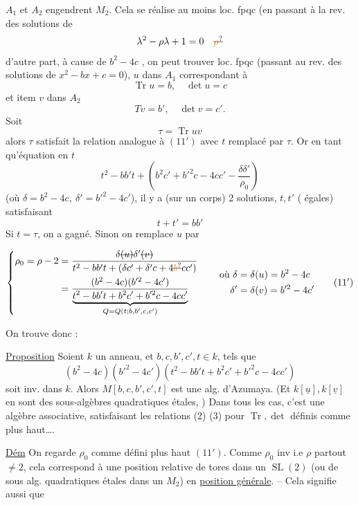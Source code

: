 $A_1$ et $A_2$  engendrent $M_2$. Cela se réalise au moins loc. fpqc (en passant à la  rev. des solutions de
\[ \lambda^2-\rho\lambda+1=0\quad\deleted{\unsure{\rho}} \]
d'autre part, à cause de $b^2-4c$ , on peut trouver loc. fpqc (passant au rev. des solutions de $x^2-bx+c=0$), $u$ dans $A_1$ correspondant à
\[ \operatorname{Tr}u=b,\quad \det u=c \]
et item $v$ dans $A_2$
\[ Tv=b',\quad \det v=c'. \]
Soit 
\[ \tau=\operatorname{Tr}uv \]
alors $\tau$ satisfait la relation analogue à $(11')$ avec $t$ remplacé par $\tau$. Or en tant qu'équation en $t$
\[ t^2-bb't+\left(b^2c'+b'^2c-4cc'-\frac{\delta\delta'}{\rho_0}\right) \]
(où $\delta=b^2-4c,\ \delta'=b'^2-4c'$), il y a  (sur un corps)  2 solutions,  $t,t'$ ( égales) satisfaisant
\[ t+t'=bb' \]
Si $t=\tau$, on a gagné. Sinon  on remplace $u$ par

\[
\left\{\begin{aligned}
\rho_0=\rho-2
&=\frac{\delta\deleted{(u)}\delta'\deleted{(v)}}{t^2-bb't+(\delta c'+\delta'c+4\deleted{\unsure{b}}cc')}\\
&=\frac{(b^2-4c)(b'^2-4c')}{\underbrace{t^2-bb't+b^2c'+b'^2c-4cc'}_{Q=Q(t;b,b',c,c')}}
\end{aligned}\right.\qquad
\begin{aligned}\text{où }\delta&=\delta(u)=b^2-4c\\ \delta'&=\delta(v)=b'^2-4c'\end{aligned}
\tag*{$(11')$}
\]

On trouve donc :

\uline{Proposition} Soient $k$ un anneau, et $b,c,b',c',t\in k$, tels que
\[ (b^2-4c)(b'^2-4c')(t^2-bb't+b^2c'+b'^2c-4cc') \]
soit inv. dans $k$. Alors $M[b,c,b',c',t]$ est une alg. d'Azumaya. (Et $k[\underline u],k[\underline v]$ en sont des sous-algèbres quadratiques étales, ) Dans tous les cas, c'est une algèbre associative,  satisfaisant les relations (2) (3) pour $\operatorname{Tr},\det$ définis comme plus haut\ldots.

\uline{Dém} On regarde $\rho_0$ comme défini plus haut $(11')$. Comme $\rho_0$  inv i.e $\rho$ partout $\ne2$, cela correspond à une position relative de tores dans un $\operatorname{SL}(2)$ (ou de sous alg. quadratiques  étales dans un $M_2$) en \uline{position générale}. -- Cela signifie aussi que

